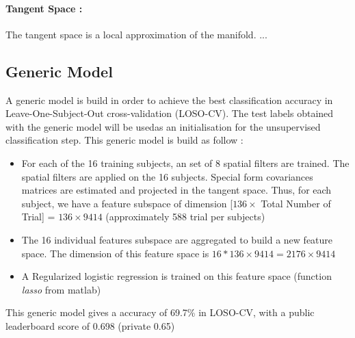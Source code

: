 \documentclass[11pt,a4paper]{article}
\begin{document}
\paragraph{Tangent Space :} The tangent space is a local approximation of the manifold.
...

\subsection{Generic Model}
A generic model is build in order to achieve the best classification accuracy in Leave-One-Subject-Out cross-validation (LOSO-CV). The test labels obtained with the generic model will be usedas an initialisation for the unsupervised classification step. This generic model is build as follow : 
\begin{itemize}
\item For each of the 16 training subjects, an set of 8 spatial filters are trained. The spatial filters are applied on the 16 subjects. Special form covariances matrices are estimated and projected in the tangent space. Thus, for each subject, we have a feature subspace of dimension [$ 136 \times $ Total Number of Trial] = $136 \times 9414$ (approximately 588 trial per subjects)
\item The 16 individual features subspace are aggregated to build a new feature space. The dimension of this feature space is $16*136 \times 9414 = 2176 \times 9414$
\item A Regularized logistic regression is trained on this feature space (function \emph{lasso }from matlab)
\end{itemize}
This generic model gives a accuracy of 69.7\% in LOSO-CV, with a public leaderboard score of 0.698 (private 0.65)
\end{document}
